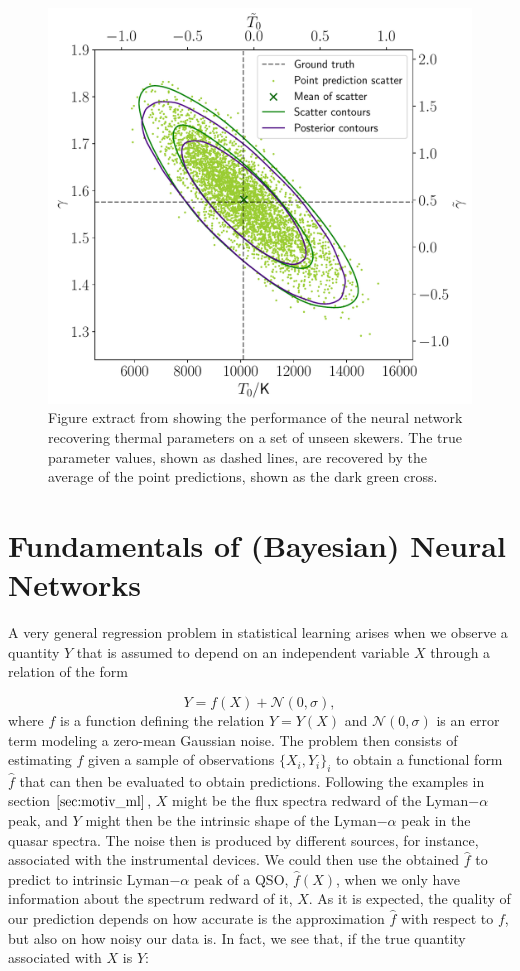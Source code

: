 \begin{figure}
    \centering
    \includegraphics[width=0.6\linewidth]{img//ML/scatter__and__posterior_contours_fiducial_tdr.pdf}
    \caption{Figure extract from \cite{lynna} showing the performance of the neural network recovering thermal parameters on a set of unseen skewers. The true parameter values, shown as dashed lines, are recovered by the average of the point predictions, shown as the dark green cross.}
    \label{fig:ML LYNNA}
\end{figure}






\section{Fundamentals of (Bayesian) Neural Networks}

A very general regression problem in statistical learning \cite{James2021} arises when we observe a quantity $Y$ that is assumed to depend on an independent variable $X$ through a relation of the form

\begin{equation}
    Y = f(X)+\mathcal{N}(0,\sigma),
\end{equation}
where $f$ is a function defining the relation $Y=Y(X)$ and $\mathcal{N}(0,\sigma)$ is an error term modeling a zero-mean Gaussian noise. The problem then consists of estimating $f$ given a sample of observations $\{ X_i, Y_i\}_i$ to obtain a functional form $\hat{f}$ that can then be evaluated to obtain predictions. Following the examples in section $\ref{sec:motiv_ml}$, $X$ might be the flux spectra redward of the Lyman$-\alpha$ peak, and $Y$ might then be the intrinsic shape of the Lyman$-\alpha$ peak in the quasar spectra. The noise then is produced by different sources, for instance, associated with the instrumental devices. We could then use the obtained $\hat{f}$ to predict to intrinsic Lyman$-\alpha$ peak of a QSO, $\hat{f}(X)$, when we only have information about the spectrum redward of it, $X$. As it is expected, the quality of our prediction depends on how accurate is the approximation $\hat{f}$ with respect to $f$, but also on how noisy our data is. In fact, we see that, if the true quantity associated with $X$ is $Y$:

